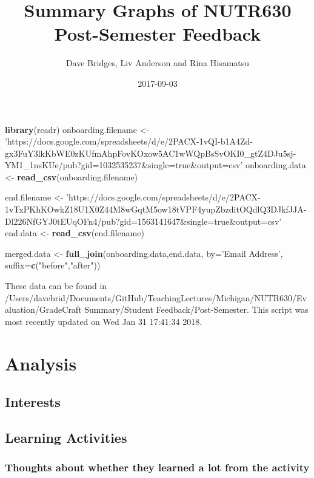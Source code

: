 \documentclass[]{article}
\title{Summary Graphs of NUTR630 Post-Semester Feedback}
\author{Dave Bridges, Liv Anderson and Rina Hisamatsu}
\date{2017-09-03}
\newenvironment{Shaded}{\begin{snugshade}}{\end{snugshade}}
\newcommand{\KeywordTok}[1]{\textcolor[rgb]{0.13,0.29,0.53}{\textbf{{#1}}}}
\newcommand{\DataTypeTok}[1]{\textcolor[rgb]{0.13,0.29,0.53}{{#1}}}
\newcommand{\StringTok}[1]{\textcolor[rgb]{0.31,0.60,0.02}{{#1}}}
\newcommand{\NormalTok}[1]{{#1}}
\begin{document}
\maketitle

{
\setcounter{tocdepth}{2}
\tableofcontents
}
\begin{Shaded}
\begin{Highlighting}[]
\KeywordTok{library}\NormalTok{(readr)}
\NormalTok{onboarding.filename <-}\StringTok{ 'https://docs.google.com/spreadsheets/d/e/2PACX-1vQI-b1A4Zd-gx3FuY3lkKbWE0zKUfmAhpFovKOxow5AC1wWQpBsSvOKI0_gtZ4DJu5sj-YM1_1nsKUe/pub?gid=1032535237&single=true&output=csv'}
\NormalTok{onboarding.data <-}\StringTok{ }\KeywordTok{read_csv}\NormalTok{(onboarding.filename)}

\NormalTok{end.filename <-}\StringTok{ 'https://docs.google.com/spreadsheets/d/e/2PACX-1vTxPKhKOwkZ18U1X0Z44M8wGqtM5ow18tVPF4yupZbzditOQdlQ3DJkfJJA-Dl226NfGYJ0tEUqOFn4/pub?gid=1563141647&single=true&output=csv'}
\NormalTok{end.data <-}\StringTok{ }\KeywordTok{read_csv}\NormalTok{(end.filename)}

\NormalTok{merged.data <-}\StringTok{ }\KeywordTok{full_join}\NormalTok{(onboarding.data,end.data, }\DataTypeTok{by=}\StringTok{'Email Address'}\NormalTok{, }\DataTypeTok{suffix=}\KeywordTok{c}\NormalTok{(}\StringTok{"before"}\NormalTok{,}\StringTok{"after"}\NormalTok{))}
\end{Highlighting}
\end{Shaded}

These data can be found in
/Users/davebrid/Documents/GitHub/TeachingLectures/Michigan/NUTR630/Evaluation/GradeCraft
Summary/Student Feedback/Post-Semester. This script was most recently
updated on Wed Jan 31 17:41:34 2018.

\section{Analysis}\label{analysis}

\subsection{Interests}\label{interests}

\subsection{Learning Activities}\label{learning-activities}

\subsubsection{Thoughts about whether they learned a lot from the
activity}\label{thoughts-about-whether-they-learned-a-lot-from-the-activity}
\end{document}
